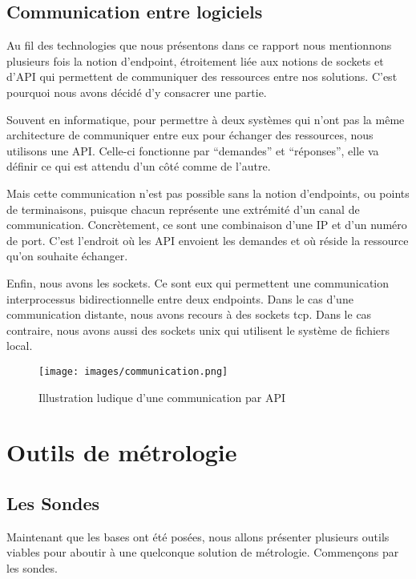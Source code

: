 \documentclass[oneside,12pt]{report}
\begin{document}
\section{Communication entre logiciels}

Au fil des technologies que nous présentons dans ce rapport nous mentionnons plusieurs fois la notion d'endpoint, étroitement liée aux notions de sockets et d'API qui permettent de communiquer des ressources entre nos solutions. C'est pourquoi nous avons décidé d'y consacrer une partie. \newline

Souvent en informatique, pour permettre à deux systèmes qui n'ont pas la même architecture de communiquer entre eux pour échanger des ressources, nous utilisons une API. Celle-ci fonctionne par “demandes” et “réponses”, elle va définir ce qui est attendu d'un côté comme de l'autre. \newline

Mais cette communication n'est pas possible sans la notion d'endpoints, ou points de terminaisons, puisque chacun représente une extrémité d'un canal de communication. Concrètement, ce sont une combinaison d'une IP et d'un numéro de port. C'est l'endroit où les API envoient les demandes et où réside la ressource qu'on souhaite échanger. \newline

Enfin, nous avons les sockets. Ce sont eux qui permettent une communication interprocessus bidirectionnelle entre deux endpoints. Dans le cas d'une communication distante, nous avons recours à des sockets tcp. Dans le cas contraire, nous avons aussi des sockets unix qui utilisent le système de fichiers local.

\begin{figure}[!ht]
    \centering
    \texttt{[image: images/communication.png]}
    \caption{Illustration ludique d'une communication par API}
    \label{fig:mesh1}
\end{figure}

\chapter{Outils de métrologie}
\section{Les Sondes}

Maintenant que les bases ont été posées, nous allons présenter plusieurs outils viables pour aboutir à une quelconque solution de métrologie. Commençons par les sondes. 
\end{document}
